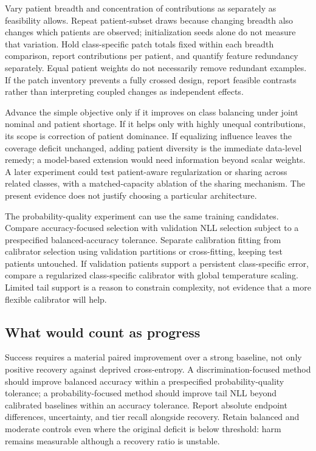 \documentclass[11pt]{article}
\begin{document}
Vary patient breadth and concentration of contributions as separately as feasibility allows. Repeat patient-subset draws because changing breadth also changes which patients are observed; initialization seeds alone do not measure that variation. Hold class-specific patch totals fixed within each breadth comparison, report contributions per patient, and quantify feature redundancy separately. Equal patient weights do not necessarily remove redundant examples. If the patch inventory prevents a fully crossed design, report feasible contrasts rather than interpreting coupled changes as independent effects.

Advance the simple objective only if it improves on class balancing under joint nominal and patient shortage. If it helps only with highly unequal contributions, its scope is correction of patient dominance. If equalizing influence leaves the coverage deficit unchanged, adding patient diversity is the immediate data-level remedy; a model-based extension would need information beyond scalar weights. A later experiment could test patient-aware regularization or sharing across related classes, with a matched-capacity ablation of the sharing mechanism. The present evidence does not justify choosing a particular architecture.

The probability-quality experiment can use the same training candidates. Compare accuracy-focused selection with validation NLL selection subject to a prespecified balanced-accuracy tolerance. Separate calibration fitting from calibrator selection using validation partitions or cross-fitting, keeping test patients untouched. If validation patients support a persistent class-specific error, compare a regularized class-specific calibrator with global temperature scaling. Limited tail support is a reason to constrain complexity, not evidence that a more flexible calibrator will help.

\subsection{What would count as progress}
\label{sec:discussion-validation}
Success requires a material paired improvement over a strong baseline, not only positive recovery against deprived cross-entropy. A discrimination-focused method should improve balanced accuracy within a prespecified probability-quality tolerance; a probability-focused method should improve tail NLL beyond calibrated baselines within an accuracy tolerance. Report absolute endpoint differences, uncertainty, and tier recall alongside recovery. Retain balanced and moderate controls even where the original deficit is below threshold: harm remains measurable although a recovery ratio is unstable.
\end{document}

